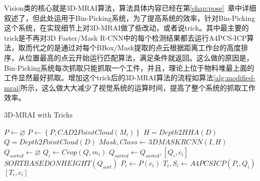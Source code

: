 Vision类的核心就是3D-MRAI算法，算法具体内容已经在第\ref{chap:pose}~章中详细叙述了，但此处运用于Bin-Picking系统，为了提高系统的效率，针对Bin-Picking这个系统，在实现细节上对3D-MRAI做了些改动，或者说trick。其中最主要的trick是不再对3D Faster/Mask R-CNN中的每个检测结果都去运行A4PCS-ICP算法，取而代之的是通过对每个BBox/Mask提取的点云根据距离工作台的高度排序，从位置最高的点云开始运行匹配算法，满足条件就返回。这么做的原因是，Bin-Picking系统每次抓取只能抓取一个工件，并且，理论上位于物料堆最上面的工件显然最好抓取。增加这个trick后的3D-MRAI算法的流程如算法\ref{alg:modified-mrai}所示，这么做大大减少了视觉系统的运算时间，提高了整个系统的抓取工作效率。%


\begin{algorithm}
  \caption{3D-MRAI with Tricks}
  \label{alg:modified-mrai}
  $P\leftarrow \varnothing$\;
   {
    $P\leftarrow \left\{P, CAD2PointCloud(M_i)\right\}$\;
  }
  $H = Depth2HHA(D)$\;
  $Q = Depth2PointCloud(D)$\;
  $Mask, Class \leftarrow 3DMASKRCNN(I, H)$
  $Q_{sorted}\leftarrow \varnothing$\;
   {
    $Q_i \leftarrow Crop(Q, m_i)$\;
    $Q_{sorted}\leftarrow {Q_{sorted}, [Q_i, c_i]}$\;
  }
  $SORTBASEDONHEIGHT(Q_{sort})$\;
   {
    $P_i \leftarrow P(c_i)$\;
    $T_i,S_i\leftarrow A4PCSICP(P_i, Q_i)$\;
     {
      \Return $\left[T_i, c_i\right]$\;
    }
  }
\end{algorithm}


